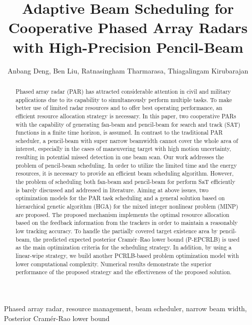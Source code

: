 \documentclass[12pt,journal,draftclsnofoot,onecolumn]{IEEEtran}
\title{Adaptive Beam Scheduling for Cooperative Phased Array Radars with High-Precision Pencil-Beam}
\author{Anbang Deng, Ben Liu, Ratnasingham Tharmarasa, Thiagalingam Kirubarajan}
\date{}
\begin{document}
\maketitle

\begin{abstract}
Phased array radar (PAR) has attracted considerable attention in civil and military applications due to its capability to simultaneously perform multiple tasks. To make better use of limited radar resources and to offer best operating performance, an efficient resource allocation strategy is necessary. In this paper, two cooperative PARs with the capability of generating fan-beam and pencil-beam for search and track (SAT) functions in a finite time horizon, is assumed. In contrast to the traditional PAR scheduler, a pencil-beam with super narrow beamwidth cannot cover the whole area of interest, especially in the cases of maneuvering target with high motion uncertainty, resulting in potential missed detection in one beam scan. Our work addresses the problem of pencil-beam scheduling. In order to utilize the limited time and the energy resources, it is necessary to provide an efficient beam scheduling algorithm. However, the problem of scheduling both fan-beam and pencil-beam for perform SaT efficiently is barely discussed and addressed in literature. Aiming at above issues, two optimization models for the PAR task scheduling and a general solution based on hierarchical genetic algorithm (HGA) for the mixed  integer nonlinear problem (MINP)  are proposed.  The proposed mechanism implements the optimal resource allocation based on the feedback information from the trackers in order to maintain a reasonably low tracking accuracy. To handle the partially covered target existence area by pencil-beam, the predicted expected posterior Cramér–Rao lower bound (P-EPCRLB) is used as the main optimization criteria for the scheduling strategy.  In addition, by using a linear-wipe strategy,  we build another  PCRLB-based problem  optimization model with lower computational complexity. Numerical results demonstrate the superior performance of the proposed strategy and the effectiveness of the proposed solution.

    
\end{abstract}

\begin{IEEEkeywords}
Phased array radar, resource management, beam scheduler, narrow beam width, Posterior Cramér-Rao lower bound
\end{IEEEkeywords}
\end{document}
